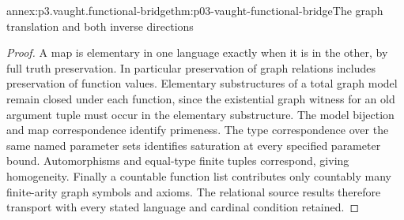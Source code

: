 \begin{annexitem}{annex:p3.vaught.functional-bridge}{thm:p03-vaught-functional-bridge}{The graph translation and both inverse directions}
\begin{proof}
A map is elementary in one language exactly when it is in the
other, by full truth preservation. In particular preservation
of graph relations includes preservation of function values.
Elementary substructures of a total graph model remain closed
under each function, since the existential graph witness for
an old argument tuple must occur in the elementary substructure.
The model bijection and map correspondence identify primeness.
The type correspondence over the same named parameter sets
identifies saturation at every specified parameter bound.
Automorphisms and equal-type finite tuples correspond, giving
homogeneity. Finally a countable function list contributes only
countably many finite-arity graph symbols and axioms.
The relational source results therefore transport with every
stated language and cardinal condition retained.
\end{proof}
\end{annexitem}

